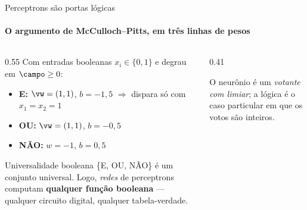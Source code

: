 \documentclass[aspectratio=169, 11pt]{beamer}
\begin{document}
\begin{frame}{Perceptrons são portas lógicas}
  \framesubtitle{O argumento de McCulloch--Pitts, em três linhas de pesos}

  \begin{columns}[T]
    \begin{column}{0.55\textwidth}
      Com entradas booleanas $x_i \in \{0,1\}$ e degrau em $\campo \ge 0$:
      \begin{itemize}\setlength{\itemsep}{0.35ex}
        \item \textbf{E:}\; $\vw = (1,1)$, $b = -1{,}5$
              \;$\Rightarrow$\; dispara só com $x_1 = x_2 = 1$
        \item \textbf{OU:}\; $\vw = (1,1)$, $b = -0{,}5$
        \item \textbf{NÃO:}\; $w = -1$, $b = 0{,}5$
      \end{itemize}

      \smallskip
      \begin{teobox}{Universalidade booleana}
        \{E, OU, NÃO\} é um conjunto universal. Logo, \emph{redes} de
        perceptrons computam \textbf{qualquer função booleana} — qualquer
        circuito digital, qualquer tabela-verdade.
      \end{teobox}
    \end{column}
    \begin{column}{0.41\textwidth}
      \begin{center}
      \end{center}
      \small O neurônio é um \emph{votante com limiar}; a lógica é o caso
      particular em que os votos são inteiros.
    \end{column}
  \end{columns}
\end{frame}
\end{document}
